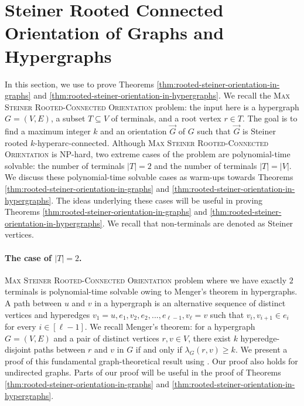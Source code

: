 \section{Steiner Rooted Connected Orientation of Graphs and Hypergraphs}
\label{sec:rooted-steiner-connected-orientations}
In this section, we use   to
prove Theorems \ref{thm:rooted-steiner-orientation-in-graphs} and \ref{thm:rooted-steiner-orientation-in-hypergraphs}. 
We recall the \textsc{Max Steiner Rooted-Connected Orientation} problem: the input here is a hypergraph $G=(V, E)$, a subset $T\subseteq V$ of terminals, and a root vertex $r\in T$. The goal is to find a maximum integer $k$ and an orientation $\overrightarrow{G}$ of $G$ such that $\overrightarrow{G}$ is Steiner rooted $k$-hyperarc-connected. 
Although \textsc{Max Steiner Rooted-Connected Orientation} is NP-hard, two extreme cases of the problem are polynomial-time solvable: the number of terminals $|T|=2$ and the number of terminals $|T|=|V|$. We discuss these polynomial-time solvable cases as warm-ups towards Theorems \ref{thm:rooted-steiner-orientation-in-graphs} and \ref{thm:rooted-steiner-orientation-in-hypergraphs}. The ideas underlying these cases will be useful in proving Theorems \ref{thm:rooted-steiner-orientation-in-graphs} and \ref{thm:rooted-steiner-orientation-in-hypergraphs}. 
We recall that non-terminals are denoted as Steiner vertices. 

\paragraph{The case of $|T|=2$.} \textsc{Max Steiner Rooted-Connected Orientation} problem where we have exactly $2$ terminals is polynomial-time solvable owing to Menger's theorem in hypergraphs. 
A path between $u$ and $v$ in a hypergraph is an alternative sequence of distinct vertices and hyperedges $v_1=u, e_1, v_2, e_2, ..., e_{\ell-1}, v_{\ell}=v$ such that $v_i, v_{i+1}\in e_i$ for every $i\in [\ell-1]$. 
We recall Menger's theorem: for a hypergraph $G=(V, E)$ and a pair of distinct vertices $r, v\in V$, there exist $k$ hyperedge-disjoint paths between $r$ and $v$ in $G$ if and only if $\lambda_G(r,v)\ge k$. We present a proof of this fundamental graph-theoretical result using . Our proof also holds for undirected graphs. 
Parts of our proof will be useful in the proof of Theorems \ref{thm:rooted-steiner-orientation-in-graphs} and \ref{thm:rooted-steiner-orientation-in-hypergraphs}. 

